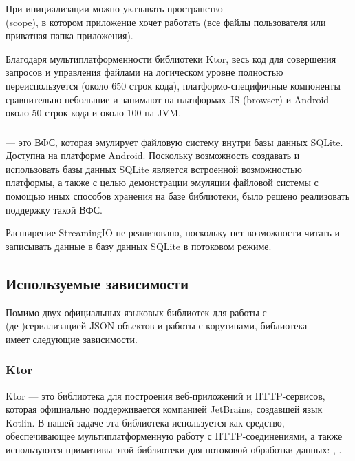     При инициализации  можно указывать пространство\\ (scope), в котором приложение хочет работать (все файлы пользователя или приватная папка приложения).

    Благодаря мультиплатформенности библиотеки Ktor, весь код для совершения запросов и управления файлами на логическом уровне полностью переиспользуется (около 650 строк кода), платформо-специфичные компоненты сравнительно небольшие и занимают на платформах JS (browser) и Android около 50 строк кода и около 100 на JVM.
  \subsubsection{}
     --- это ВФС, которая эмулирует файловую систему внутри базы данных SQLite. Доступна на платформе Android. Поскольку возможность создавать и использовать базы данных SQLite является встроенной возможностью платформы, а также с целью демонстрации эмуляции файловой системы с помощью иных способов хранения на базе библиотеки, было решено реализовать поддержку такой ВФС. 

    Расширение StreamingIO не реализовано, поскольку нет возможности читать и записывать данные в базу данных SQLite в потоковом режиме.


\subsection{Используемые зависимости}
  Помимо двух официальных языковых библиотек для работы с\\ (де-)сериализацией JSON объектов и работы с корутинами, библиотека\\  имеет следующие зависимости.
  \subsubsection{Ktor}\label{dependencies-ktor}
    Ktor\cite{ktor} --- это библиотека для построения веб-приложений и HTTP-сервисов, которая официально поддерживается компанией JetBrains, создавшей язык Kotlin. В нашей задаче эта библиотека используется как средство, обеспечивающее мультиплатформенную работу с HTTP-соединениями, а также используются примитивы этой библиотеки для потоковой обработки данных: , .

